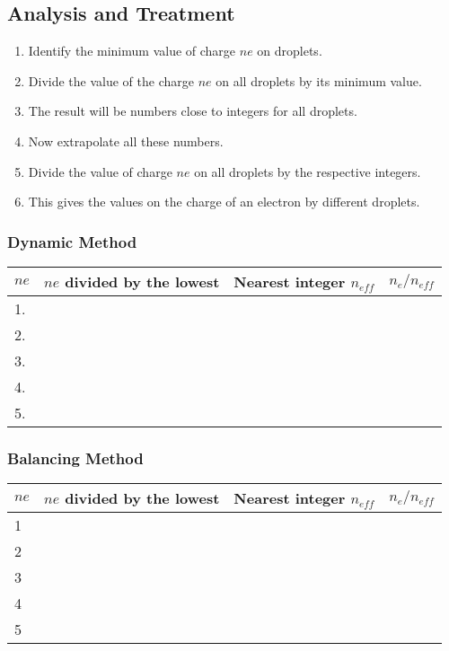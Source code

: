 \documentclass[%
sor,
 jor,
 amsmath,amssymb,
 reprint,%
]{revtex4-2}
\begin{document}
\subsection{Analysis and Treatment}

\begin{enumerate}
  \item Identify the minimum value of charge $ne$ on droplets.
  \item Divide the value of the charge $ne$ on all droplets by its minimum value.
  \item The result will be numbers close to integers for all droplets.
  \item Now extrapolate all these numbers. 
  \item Divide the value of charge $ne$ on all droplets by the respective integers.
  \item This gives the values on the charge of an electron by different droplets.
\end{enumerate}
\subsubsection{Dynamic Method}
\begin{table}[H]
\centering
\begin{tabular}{|m{3cm}|m{3cm}|m{3cm}|m{3cm}|}
    \hline
    $ne$ & $ne$ divided by the lowest & Nearest integer $n_{eff}$ & $n_e/n_{eff}$ \\
    \hline
    1. &    &  &    \\
    \hline
2.  &  &  &    \\
    \hline
3.  &  &  &    \\
    \hline
4.  &  &  &    \\
    \hline
5.  &  &  &    \\
    \hline
\end{tabular}
\end{table}
\vspace{2cm}


\subsubsection{Balancing Method}

\begin{table}[H]
\centering
\begin{tabular}{|m{3cm}|m{3cm}|m{3cm}|m{3cm}|}
    \hline
    $ne$ & $ne$ divided by the lowest & Nearest integer $n_{eff}$ & $n_e/n_{eff}$ \\
    \hline
    1 &    &  &    \\
    \hline
2   &  &    &  \\
    \hline
3   &  &    &  \\
    \hline
4   &  &    &  \\
    \hline
5   &  &    &  \\
    \hline
\end{tabular}
\end{table}
\vspace{5cm}
\end{document}
